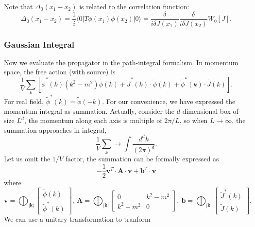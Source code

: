 Note that $\Delta_0(x_1-x_2)$ is related to the correlation function:
\begin{equation}
	\Delta_0(x_1-x_2) = \frac{1}{i} \langle 0| T\phi(x_1)\phi(x_2)|0\rangle
	= \frac{\delta}{i\delta J(x_1)}\frac{\delta}{i\delta J(x_2)} W_0[J].
\end{equation}




\subsubsection{Gaussian Integral}
Now we evaluate the propagator in the path-integral formalism.
In momentum space, the free action (with source) is 
\begin{equation*}
	\frac{1}{V}\sum_k \left[\tilde\phi^*(k)( k^2-m^2)\tilde\phi(k)+\tilde J^*(k)\cdot\tilde\phi(k)+\tilde\phi^*(k)\cdot\tilde J(k)\right].
\end{equation*}
For real field, $\tilde\phi^*(k) = \tilde\phi(-k)$.
For our convenience, we have expressed the momentum integral as summation.
Actually, consider the $d$-dimensional box of size $L^d$, the momentum along each axis is multiple of $2\pi/L$, so when $L\rightarrow \infty$, the summation approaches in integral,
\begin{equation*}
	\frac{1}{V}\sum_k \rightarrow \int \frac{d^d k}{(2\pi)^d}.
\end{equation*}
Let us omit the $1/V$ factor, the summation can be formally expressed as
\begin{equation}
	-\frac{1}{2}\mathbf{v}^T \cdot \mathbf A\cdot \mathbf{v} + \mathbf{b}^T \cdot \mathbf{v}
\end{equation}
where
\begin{equation*}
	\mathbf v = \bigoplus_{|\mathbf k|} \left[
	\begin{array}{c}
		\tilde{\phi}(k) \\ 
		\tilde{\phi}^*(k) 
	\end{array}\right],\ 
	\mathbf A = \bigoplus_{|\mathbf k|} \left[
	\begin{array}{cc} 
		0 & k^2-m^2 \\ 
		k^2-m^2 & 0 
	\end{array}\right],\ 
	\mathbf b = \bigoplus_{|\mathbf k|} \left[
	\begin{array}{c}
		\tilde{J}^*(k) \\ 
		\tilde{J}(k) 
	\end{array}\right].
\end{equation*}
We can use a unitary transformation to tranform
